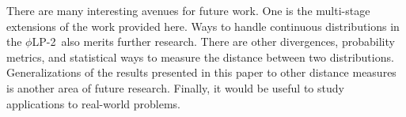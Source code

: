 \documentclass[opre,nonblindrev]{informs3} %
\newcommand{\plp}{$\phi$LP-2}
\begin{document}
There are many interesting avenues for future work. 
One is the multi-stage extensions of the work provided here. 
Ways to handle continuous distributions in the \plp\ also merits further research. 
There are other divergences, probability metrics, and statistical ways to measure the distance between two distributions. 
Generalizations of the results presented in this paper to other distance measures is another area of future research. 
Finally, it would be useful to study applications to real-world problems.

\end{document}
